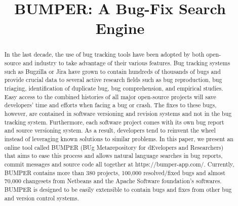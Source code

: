 \documentclass[conference]{IEEEtran}
\begin{document}
\title{BUMPER: A Bug-Fix Search Engine}


\author{
\and
{}
}

\maketitle

\begin{abstract}
  In the last decade, the use of bug tracking tools
  have been adopted by both open-source and industry to take
  advantage of their various features.
 Bug tracking systems such
  as Bugzilla or Jira have grown to contain hundreds of thousands
  of bugs and provide crucial data to several active research fields
  such as bug reproduction, bug triaging, identification of
  duplicate bug, bug comprehension, and empirical studies.
 Easy
  access to the combined histories of all major open-source
  projects will save developers’ time and efforts when facing a bug
  or crash.
 The fixes to these bugs, however, are contained in
  software versioning and revision systems and not in the bug
  tracking system.
 Furthermore, each software project comes with
  its own bug report and source versioning system.
 As a result,
  developers tend to reinvent the wheel instead of leveraging
  known solutions to similar problems.
 In this paper, we present
  an online tool called BUMPER (BUg Metarepository for
  dEvelopers and Researchers) that aims to ease this process and
  allows natural language searches in bug reports, commit
  messages and source code all together at https://bumper-app.com/.
  Currently, BUMPER contains more than 380 projects,
  100,000 resolved/fixed bugs and almost 70,000 changesets from
  Netbeans and the Apache Software foundation’s softwares.
  BUMPER is designed to be easily extensible to contain bugs and
  fixes from other bug and version control systems.

\end{abstract}
\end{document}
